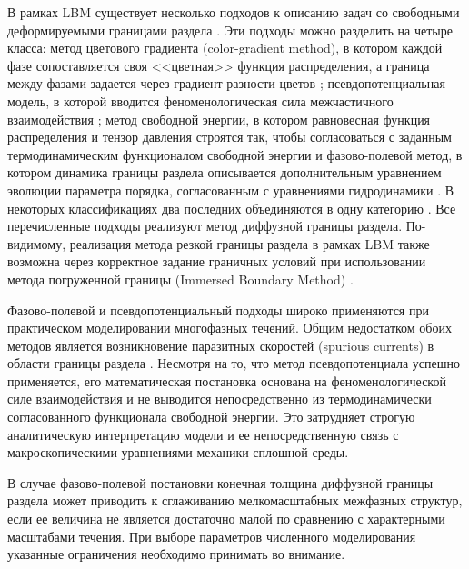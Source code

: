 \documentclass[12pt,a4paper]{article}
\begin{document}
В рамках LBM существует несколько подходов к описанию задач со свободными деформируемыми границами раздела \cite{Krger2017, Succi2018, Huang2015, Sukop2006, Inamuro2021, Preprint2025, Wang2019, Chen2014, Li2016, Chen2026, Cao2020}. Эти подходы можно разделить на четыре класса: метод цветового градиента (color-gradient method), в котором каждой фазе сопоставляется своя <<цветная>> функция распределения, а граница между фазами задается через градиент разности цветов \cite{Gunstensen1991, Zahid2025}; псевдопотенциальная модель, в которой вводится феноменологическая сила межчастичного взаимодействия \cite{Shan1993}; метод свободной энергии, в котором равновесная функция распределения и тензор давления строятся так, чтобы согласоваться с заданным термодинамическим функционалом свободной энергии \cite{Swift1995} и фазово-полевой метод, в котором динамика границы раздела описывается дополнительным уравнением эволюции параметра порядка, согласованным с уравнениями гидродинамики \cite{He1999-1, He1999-2}. В некоторых классификациях два последних объединяются в одну категорию \cite{Krger2017, Inamuro2021, Li2016}. Все перечисленные подходы реализуют метод диффузной границы раздела. По-видимому, реализация метода резкой границы раздела в рамках LBM также возможна через корректное задание граничных условий при использовании метода погруженной границы (Immersed Boundary Method) \cite{Inamuro2021, Cao2020}.

Фазово-полевой и псевдопотенциальный подходы широко применяются при практическом моделировании многофазных течений. Общим недостатком обоих методов является возникновение паразитных скоростей (spurious currents) в области границы раздела \cite{Krger2017, Chen2014, Li2016}. Несмотря на то, что метод псевдопотенциала успешно применяется, его математическая постановка основана на феноменологической силе взаимодействия и не выводится непосредственно из термодинамически согласованного функционала свободной энергии. Это затрудняет строгую аналитическую интерпретацию модели и ее непосредственную связь с макроскопическими уравнениями механики сплошной среды. 

В случае фазово-полевой постановки конечная толщина диффузной границы раздела может приводить к сглаживанию мелкомасштабных межфазных структур, если ее величина не является достаточно малой по сравнению с характерными масштабами течения. При выборе параметров численного моделирования указанные ограничения необходимо принимать во внимание.
\end{document}
